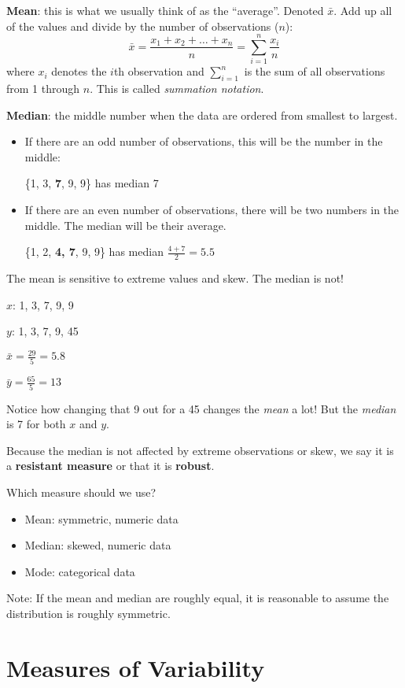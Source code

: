 \documentclass[
]{book}
\providecommand{\tightlist}{%
  \setlength{\itemsep}{0pt}\setlength{\parskip}{0pt}}
\begin{document}
\textbf{Mean}: this is what we usually think of as the ``average''. Denoted \(\bar{x}\). Add up all of the values and divide by the number of observations (\(n\)):
\[
  \bar{x} = \frac{x_1 + x_2 + \dots + x_n}{n} = \sum_{i=1}^n \frac{x_i}{n}
\]
where \(x_i\) denotes the \(i\)th observation and \(\sum_{i=1}^n\) is the sum of all observations from 1 through \(n\). This is called \emph{summation notation}.

\textbf{Median}: the middle number when the data are ordered from smallest to largest.

\begin{itemize}
\tightlist
\item
  If there are an odd number of observations, this will be the number in the middle:

  \{1, 3, \textbf{7}, 9, 9\} has median 7
\item
  If there are an even number of observations, there will be two numbers in the middle. The median will be their average.

  \{1, 2, \textbf{4, 7}, 9, 9\} has median \(\frac{4+7}{2}=5.5\)
\end{itemize}

The mean is sensitive to extreme values and skew. The median is not!

\(x\): 1, 3, 7, 9, 9

\(y\): 1, 3, 7, 9, 45

\(\bar{x} = \frac{29}{5} = 5.8\)

\(\bar{y} = \frac{65}{5} = 13\)

Notice how changing that 9 out for a 45 changes the \emph{mean} a lot! But the \emph{median} is 7 for both \(x\) and \(y\).

Because the median is not affected by extreme observations or skew, we say it is a \textbf{resistant measure} or that it is \textbf{robust}.

Which measure should we use?

\begin{itemize}
\tightlist
\item
  Mean: symmetric, numeric data
\item
  Median: skewed, numeric data
\item
  Mode: categorical data
\end{itemize}

Note: If the mean and median are roughly equal, it is reasonable to assume the distribution is roughly symmetric.

\hypertarget{measures-of-variability}{%
\section{Measures of Variability}\label{measures-of-variability}}
\end{document}
